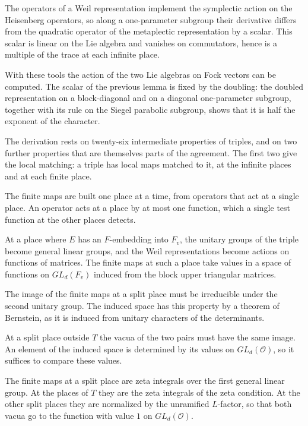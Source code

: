 The operators of a Weil representation implement the symplectic action on the
Heisenberg operators, so along a one-parameter subgroup their derivative
differs from the quadratic operator of the metaplectic representation by a
scalar. This scalar is linear on the Lie algebra and vanishes on commutators,
hence is a multiple of the trace at each infinite place.

With these tools the action of the two Lie algebras on Fock vectors can be
computed. The scalar of the previous lemma is fixed by the doubling: the
doubled representation on a block-diagonal and on a diagonal one-parameter
subgroup, together with its rule on the Siegel parabolic subgroup, shows that
it is half the exponent of the character.

The derivation rests on twenty-six intermediate properties of triples, and on
two further properties that are themselves parts of the agreement. The first
two give the local matching: a triple has local maps matched to it, at the
infinite places and at each finite place.

The finite maps are built one place at a time, from operators that act at a
single place. An operator acts at a place by at most one function, which a
single test function at the other places detects.

At a place where $E$ has an $F$-embedding into $F_v$, the unitary groups of the
triple become general linear groups, and the Weil representations become actions
on functions of matrices. The finite maps at such a place take values in a space
of functions on $GL_d(F_v)$ induced from the block upper triangular matrices.

The image of the finite maps at a split place must be irreducible under the
second unitary group. The induced space has this property by a theorem of
Bernstein, as it is induced from unitary characters of the determinants.

At a split place outside $T$ the vacua of the two pairs must have the same
image. An element of the induced space is determined by its values on
$GL_d(\mathcal O)$, so it suffices to compare these values.

The finite maps at a split place are zeta integrals over the first general
linear group. At the places of $T$ they are the zeta integrals of the zeta
condition. At the other split places they are normalized by the unramified
$L$-factor, so that both vacua go to the function with value $1$ on
$GL_d(\mathcal O)$.

